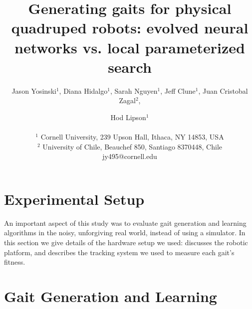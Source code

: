 \documentclass[letterpaper]{article}
\title{Generating gaits for physical quadruped robots: evolved neural networks vs. local parameterized search}
\author {Jason Yosinski$^{1}$,
Diana Hidalgo$^{1}$,
Sarah Nguyen$^{1}$,
Jeff Clune$^{1}$,
Juan Cristobal Zagal$^{2}$,
\and Hod Lipson$^{1}$\\
\mbox{} \\
$^1$ Cornell University, 239 Upson Hall, Ithaca, NY  14853, USA\\
$^2$ University of Chile, Beauchef 850, Santiago 8370448, Chile\\
jy495@cornell.edu}
\begin{document}
\maketitle

\begin{abstract}

\end{abstract}








\section{Experimental Setup}

An important aspect of this study was to evaluate gait generation and
learning algorithms in the noisy, unforgiving real world, instead of
using a simulator.  In this section we give details of the hardware
setup we used:  discusses the robotic
platform, and  describes the tracking system
we used to measure each gait's fitness.




\section{Gait Generation and Learning}











\footnotesize


\end{document}

